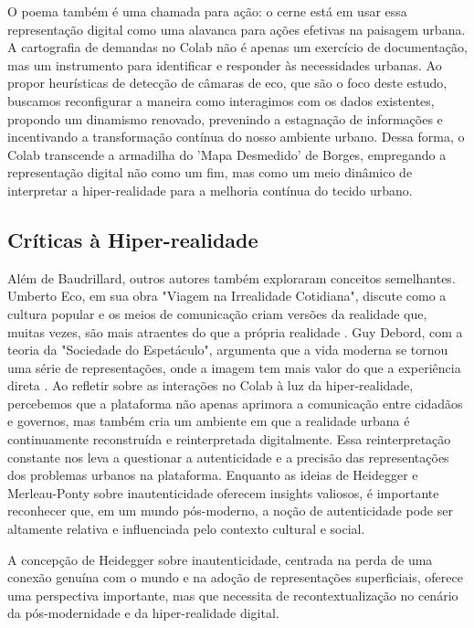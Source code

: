 O poema também é uma chamada para ação: o cerne está em usar essa representação digital como uma alavanca para ações efetivas na paisagem urbana. A cartografia de demandas no Colab não é apenas um exercício de documentação, mas um instrumento para identificar e responder às necessidades urbanas. Ao propor heurísticas de detecção de câmaras de eco, que são o foco deste estudo, buscamos reconfigurar a maneira como interagimos com os dados existentes, propondo um dinamismo renovado, prevenindo a estagnação de informações e incentivando a transformação contínua do nosso ambiente urbano. Dessa forma, o Colab transcende a armadilha do 'Mapa Desmedido' de Borges, empregando a representação digital não como um fim, mas como um meio dinâmico de interpretar a hiper-realidade para a melhoria contínua do tecido urbano.

\subsection*{Críticas à Hiper-realidade}

Além de Baudrillard, outros autores também exploraram conceitos semelhantes. Umberto Eco, em sua obra "Viagem na Irrealidade Cotidiana", discute como a cultura popular e os meios de comunicação criam versões da realidade que, muitas vezes, são mais atraentes do que a própria realidade \cite{1993_Eco_BOOK}. Guy Debord, com a teoria da "Sociedade do Espetáculo", argumenta que a vida moderna se tornou uma série de representações, onde a imagem tem mais valor do que a experiência direta \cite{1993_Eco_BOOK}. Ao refletir sobre as interações no Colab à luz da hiper-realidade, percebemos que a plataforma não apenas aprimora a comunicação entre cidadãos e governos, mas também cria um ambiente em que a realidade urbana é continuamente reconstruída e reinterpretada digitalmente. Essa reinterpretação constante nos leva a questionar a autenticidade e a precisão das representações dos problemas urbanos na plataforma. Enquanto as ideias de Heidegger e Merleau-Ponty sobre inautenticidade oferecem insights valiosos, é importante reconhecer que, em um mundo pós-moderno, a noção de autenticidade pode ser altamente relativa e influenciada pelo contexto cultural e social.

A concepção de Heidegger sobre inautenticidade, centrada na perda de uma conexão genuína com o mundo e na adoção de representações superficiais, oferece uma perspectiva importante, mas que necessita de recontextualização no cenário da pós-modernidade e da hiper-realidade digital. 

